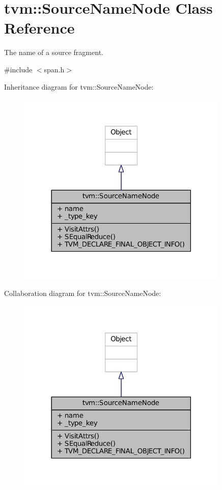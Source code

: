 \hypertarget{classtvm_1_1SourceNameNode}{}\section{tvm\+:\+:Source\+Name\+Node Class Reference}
\label{classtvm_1_1SourceNameNode}


The name of a source fragment.  




{\ttfamily \#include $<$span.\+h$>$}



Inheritance diagram for tvm\+:\+:Source\+Name\+Node\+:
\nopagebreak
\begin{figure}[H]
\begin{center}
\leavevmode
\includegraphics[width=285pt]{classtvm_1_1SourceNameNode__inherit__graph}
\end{center}
\end{figure}


Collaboration diagram for tvm\+:\+:Source\+Name\+Node\+:
\nopagebreak
\begin{figure}[H]
\begin{center}
\leavevmode
\includegraphics[width=285pt]{classtvm_1_1SourceNameNode__coll__graph}
\end{center}
\end{figure}
